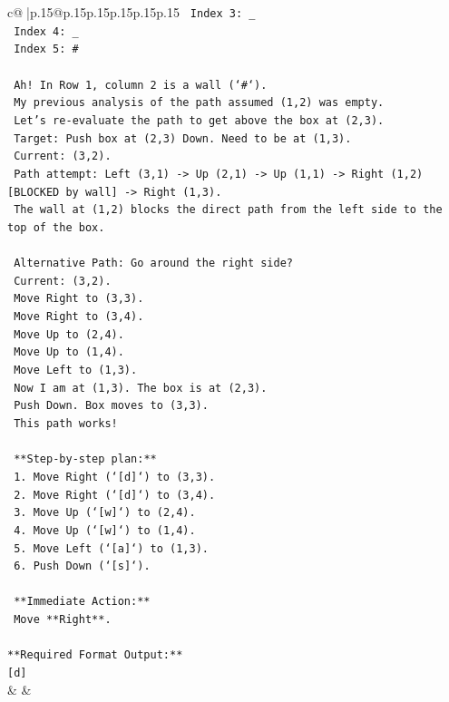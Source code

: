 \documentclass{article}
\begin{document}
{\begin{supertabular}{c@{$\;$}|p{.15\linewidth}@{}p{.15\linewidth}p{.15\linewidth}p{.15\linewidth}p{.15\linewidth}p{.15\linewidth}}
{{{\texttt{  Index 3: \_} \\
\texttt{  Index 4: \_} \\
\texttt{  Index 5: \#} \\
\\ 
\texttt{  Ah! In Row 1, column 2 is a wall (`\#`).} \\
\texttt{  My previous analysis of the path assumed (1,2) was empty.} \\
\texttt{  Let's re{-}evaluate the path to get above the box at (2,3).} \\
\texttt{  Target: Push box at (2,3) Down. Need to be at (1,3).} \\
\texttt{  Current: (3,2).} \\
\texttt{  Path attempt: Left (3,1) {-}> Up (2,1) {-}> Up (1,1) {-}> Right (1,2) {[}BLOCKED by wall{]} {-}> Right (1,3).} \\
\texttt{  The wall at (1,2) blocks the direct path from the left side to the top of the box.} \\
\\ 
\texttt{  Alternative Path: Go around the right side?} \\
\texttt{  Current: (3,2).} \\
\texttt{  Move Right to (3,3).} \\
\texttt{  Move Right to (3,4).} \\
\texttt{  Move Up to (2,4).} \\
\texttt{  Move Up to (1,4).} \\
\texttt{  Move Left to (1,3).} \\
\texttt{  Now I am at (1,3). The box is at (2,3).} \\
\texttt{  Push Down. Box moves to (3,3).} \\
\texttt{  This path works!} \\
\\ 
\texttt{  **Step{-}by{-}step plan:**} \\
\texttt{  1. Move Right (`{[}d{]}`) to (3,3).} \\
\texttt{  2. Move Right (`{[}d{]}`) to (3,4).} \\
\texttt{  3. Move Up (`{[}w{]}`) to (2,4).} \\
\texttt{  4. Move Up (`{[}w{]}`) to (1,4).} \\
\texttt{  5. Move Left (`{[}a{]}`) to (1,3).} \\
\texttt{  6. Push Down (`{[}s{]}`).} \\
\\ 
\texttt{  **Immediate Action:**} \\
\texttt{  Move **Right**.} \\
\\ 
\texttt{**Required Format Output:**} \\
\texttt{{[}d{]}} \\
            }
        }
    }
    & & \\ \\


\end{supertabular}}
\end{document}
